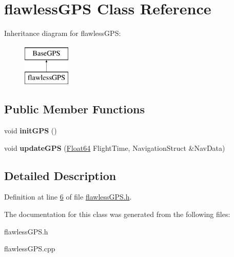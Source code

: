 \hypertarget{classflawless_g_p_s}{}\section{flawless\+G\+PS Class Reference}
\label{classflawless_g_p_s}
Inheritance diagram for flawless\+G\+PS\+:\begin{figure}[H]
\begin{center}
\leavevmode
\includegraphics[height=2.000000cm]{classflawless_g_p_s}
\end{center}
\end{figure}
\subsection*{Public Member Functions}
\begin{DoxyCompactItemize}
\item 
\mbox{\label{classflawless_g_p_s_a50cdffc0dc65e644f6191bc7c723521b}} 
void {\bfseries init\+G\+PS} ()
\item 
\mbox{\label{classflawless_g_p_s_a09c91bda959ce81236f1f52581ab3bfa}} 
void {\bfseries update\+G\+PS} (\hyperlink{group___tools_ga3f1431cb9f76da10f59246d1d743dc2c}{Float64} Flight\+Time, Navigation\+Struct \&Nav\+Data)
\end{DoxyCompactItemize}


\subsection{Detailed Description}


Definition at line \hyperlink{flawless_g_p_s_8h_source_l00006}{6} of file \hyperlink{flawless_g_p_s_8h_source}{flawless\+G\+P\+S.\+h}.



The documentation for this class was generated from the following files\+:\begin{DoxyCompactItemize}
\item 
flawless\+G\+P\+S.\+h\item 
flawless\+G\+P\+S.\+cpp\end{DoxyCompactItemize}
